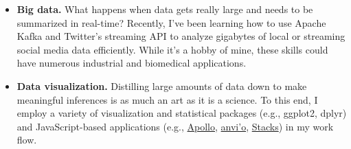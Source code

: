 \documentclass[11pt,letterpaper,sans]{moderncv}        %
\begin{document}
\begin{itemize}



\item{\textbf{Big data.} What happens when data gets really large and needs to be summarized in real-time? Recently, I've been learning how to use Apache Kafka and Twitter's streaming API to analyze gigabytes of local or streaming social media data efficiently. While it's a hobby of mine, these skills could have numerous industrial and biomedical applications.}

\vspace{4pt}

\item{\textbf{Data visualization.} Distilling large amounts of data down to make meaningful inferences is as much an art as it is a science. To this end, I employ a variety of visualization and statistical packages (e.g., ggplot2, dplyr) and JavaScript-based applications (e.g., \href{http://genomearchitect.github.io/}{Apollo}, \href{http://merenlab.org/software/anvio/}{anvi'o}, \href{http://catchenlab.life.illinois.edu/stacks}{Stacks}) in my work flow.}

\vspace{4pt}




\end{itemize}





\end{document}
